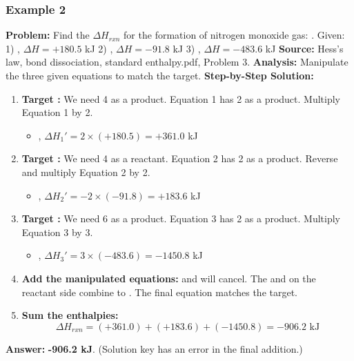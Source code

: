 \documentclass{article}
\begin{document}
\subsubsection{Example 2}
\textbf{Problem:} Find the $\Delta H_{rxn}$ for the formation of nitrogen monoxide gas: .
Given:
1) , $\Delta H = +180.5$ kJ
2) , $\Delta H = -91.8$ kJ
3) , $\Delta H = -483.6$ kJ
\textbf{Source:} Hess's law, bond dissociation, standard enthalpy.pdf, Problem 3.
\textbf{Analysis:} Manipulate the three given equations to match the target.
\textbf{Step-by-Step Solution:}
\begin{enumerate}
    \item \textbf{Target :} We need 4  as a product. Equation 1 has 2  as a product. Multiply Equation 1 by 2.
    \begin{itemize}
        \item {}, $\Delta H_1' = 2 \times (+180.5) = +361.0$ kJ
    \end{itemize}
    \item \textbf{Target :} We need 4  as a reactant. Equation 2 has 2  as a product. Reverse and multiply Equation 2 by 2.
    \begin{itemize}
        \item {}, $\Delta H_2' = -2 \times (-91.8) = +183.6$ kJ
    \end{itemize}
    \item \textbf{Target :} We need 6  as a product. Equation 3 has 2  as a product. Multiply Equation 3 by 3.
    \begin{itemize}
        \item {}, $\Delta H_3' = 3 \times (-483.6) = -1450.8$ kJ
    \end{itemize}
    \item \textbf{Add the manipulated equations:}  and  will cancel. The  and  on the reactant side combine to . The final equation matches the target.
    \item \textbf{Sum the enthalpies:}
    \[ \Delta H_{rxn} = (+361.0) + (+183.6) + (-1450.8) = -906.2 \text{ kJ} \]
\end{enumerate}
\textbf{Answer:} \textbf{-906.2 kJ}. (Solution key has an error in the final addition.)
\end{document}

